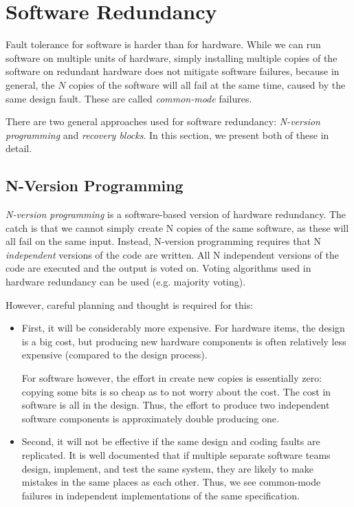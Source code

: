 \section{Software Redundancy}
\label{sec:fault-tolerance:software-redundancy}

Fault tolerance for software is harder than for hardware. While we can run software on multiple units of hardware, simply installing multiple copies of the software on redundant hardware does not mitigate software failures, because in general, the \(N\) copies of the software will all fail at the same time, caused by the same design fault.  These are called {\em common-mode} failures.

There are two general approaches used for software redundancy: \emph{N-version programming} and \emph{recovery blocks}. In this section, we present both of these in detail.

\subsection{N-Version Programming}

\emph{N-version programming} is a software-based version of hardware redundancy. The catch is that we cannot simply create N copies of the same software, as these will all fail on the same input. Instead, N-version programming requires that N \emph{independent} versions of the code are written.  All N independent versions of the code are executed and the output is voted on. Voting algorithms used in hardware redundancy can be used (e.g. majority voting).

However, careful planning and thought is required for this:

\begin{itemize}
 \item First, it will be considerably more expensive. For hardware items, the design is a big cost, but producing new hardware components is often relatively less expensive (compared to the design process).

 For software however, the effort in create new copies is essentially zero: copying some bits is so cheap as to not worry about the cost. The cost in software is all in the design. Thus, the effort to produce two independent software components is approximately double producing one.

 \item Second, it will not be effective if the same design and coding faults are replicated. It is well documented that if multiple separate software teams design, implement, and test the same system, they are likely to make mistakes in the same places as each other. Thus, we see common-mode failures in independent implementations of the same specification.

\end{itemize}


